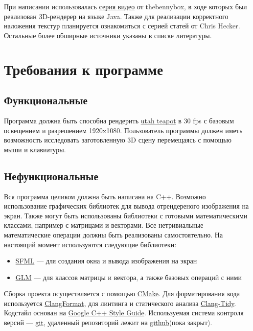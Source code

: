 \documentclass{article}
\begin{document}
При написании использовалась \href{https://www.youtube.com/watch?v=Y_vvC2G7vRo&list=PLEETnX-uPtBUbVOok816vTl1K9vV1GgH5&index=2}{серия видео} от thebennybox, в ходе 
которых был реализован 3D-рендерер на языке Java. Также для реализации 
корректного наложения текстур планируется ознакомиться с серией статей от 
Chris Hecker\cite{Textures}. Остальные более обширные источники указаны в 
списке литературы.

\section{Требования к программе}
\subsection*{Функциональные}
    Программа должна быть способна рендерить \href{https://en.wikipedia.org/wiki/Utah_teapot}{utah teapot} в 30 fps с 
    базовым освещением и разрешением 1920x1080. Пользователь программы 
    должен иметь возможность исследовать заготовленную 3D сцену перемещаясь с помощью мыши и 
    клавиатуры.  

\subsection*{Нефункциональные}
Вся программа целиком должна быть написана на C++. Возможно 
использование графических библиотек для вывода отрендереного изображения на экран.
Также могут быть использованы библиотеки с готовыми математическими классами, например с матрицами 
и векторами. Все нетривиальные математические операции должны быть реализованы самостоятельно. 
На настоящий момент используются следующие библиотеки:
\begin{itemize}
    \item \href{https://www.sfml-dev.org/index.php}{SFML} --- для создания окна и вывода изображения на экран 
    \item \href{https://github.com/g-truc/glm}{GLM} --- для классов матрицы и вектора, а также базовых 
    операций с ними
\end{itemize}
Сборка проекта осуществляется с помощью \href{https://cmake.org/}{CMake}.
Для форматирования кода используется \href{https://clang.llvm.org/docs/ClangFormat.html}{ClangFormat}, 
для линтинга и статического анализа \href{https://releases.llvm.org/10.0.0/tools/clang/tools/extra/docs/clang-tidy/index.html#:~:text=clang%2Dtidy%20is%20a%20clang,be%20deduced%20via%20static%20analysis.}{Clang-Tidy}.
Кодстайл основан на \href{https://google.github.io/styleguide/cppguide.html}{Google C++ Style Guide}.
Используемая система контроля версий --- \href{https://git-scm.com/}{git}, удаленный репозиторий 
лежит на \href{github.com}{github}(пока закрыт). 
\end{document}
